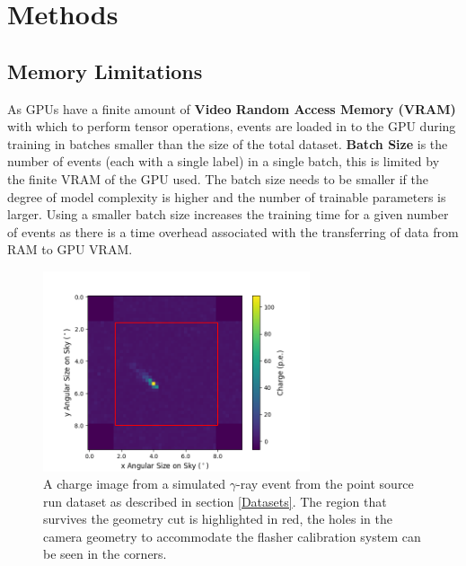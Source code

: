 \section{Methods} 

\label{Methods}

\subsection{Memory Limitations}
As GPUs have a finite amount of \textbf{Video Random Access Memory (VRAM)} with which to perform tensor operations, events are loaded in to the GPU during training in batches smaller than the size of the total dataset. \textbf{Batch Size} is the number of events (each with a single label) in a single batch, this is limited by the finite VRAM of the GPU used. The batch size needs to be smaller if the degree of model complexity is higher and the number of trainable parameters is larger. Using a smaller batch size increases the training time for a given number of events as there is a time overhead associated with the transferring of data from RAM to GPU VRAM. 
 
\begin{figure}
  \centering
  \includegraphics[width=0.7\textwidth]{figures/gammacut.png}
  \caption{A charge image from a simulated $\gamma$-ray event from the point source run dataset as described in section \ref{Datasets}. The region that survives the geometry cut is highlighted in red, the holes in the camera geometry to accommodate the flasher calibration system can be seen in the corners.}
  \label{fig:gammacut}
\end{figure}

